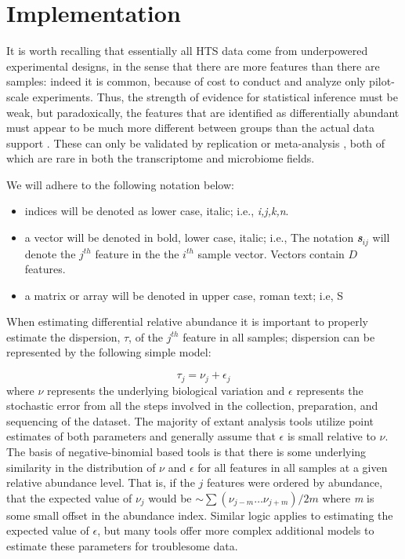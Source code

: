\documentclass{bmcart}
\begin{document}
\section*{Implementation}


It is worth recalling that essentially all HTS data come from underpowered experimental designs, in the sense that there are more features than there are samples: indeed it is common, because of cost to conduct and analyze only pilot-scale experiments. Thus, the strength of evidence for statistical inference must be weak, but paradoxically, the features that are identified as differentially abundant must appear to be much more different between groups than the actual data support  \cite{Halsey:2015aa}. These can only be validated by replication or meta-analysis \cite{Cumming:2008aa}, both of which are rare in both the transcriptome and microbiome fields. 

We will adhere to the following notation below:
\begin{itemize}
\item{indices} will be denoted as lower case, italic; i.e., \textit{i,j,k,n}. 
\item{a vector} will be denoted in bold, lower case, italic; i.e., The notation \textit{\textbf{s$_{ij}$}} will denote the $j^{th}$ feature in the the $i^{th}$ sample vector. Vectors contain $D$ features. 
\item{a matrix or array} will be denoted in upper case, roman text; i.e, S
\end{itemize}


When estimating differential relative abundance it is important to properly estimate the dispersion, $\tau$, of the $j^{th}$ feature in all samples; dispersion can be represented by the following simple model:

\begin{equation}
    \tau_{j} = \nu_j + \epsilon_j
\label{eq:dispersion}
\end{equation} 
where $\nu$ represents the underlying biological variation and $\epsilon$ represents the stochastic error  from all the steps involved in the collection, preparation, and sequencing of the dataset. The majority of extant analysis tools utilize point estimates of both parameters and generally assume that  $\epsilon$ is small relative to $\nu$.  The basis of negative-binomial based tools is that there is some underlying similarity in the distribution of $\nu$ and $\epsilon$  for all features in all samples at a given relative abundance level. That is, if the $j$ features were ordered by abundance, that the expected value of $\nu_j$ would be  $\sim \sum (\nu_{j-m}\ldots \nu_{j+m}) / 2m $ where \textit{m} is some small offset in the abundance index. Similar logic applies to estimating the expected value of $\epsilon$, but many tools offer  more complex additional models to estimate these parameters for troublesome data. 
\end{document}
